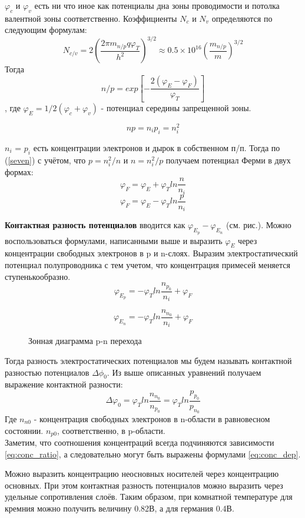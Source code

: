 $\varphi_c$ и $\varphi_v$ есть ни что иное как потенциалы дна зоны проводимости и потолка валентной зоны соответственно. Коэффициенты $N_c$ и $N_v$ определяются по следующим формулам:
$$
N_{c/v} = 2\left(\frac{2\pi m_{n/p}q\varphi_T}{h^2}\right)^{3/2} \approx 0.5\times10^{16}\left(\frac{m_{n/p}}{m}\right)^{3/2}
$$
Тогда
\begin{equation}
n/p = exp\left[-\frac{2(\varphi_E - \varphi_F)}{\varphi_T}\right]
\label{seven}
\end{equation},
где $\varphi_E = 1/2(\varphi_c + \varphi_v)$ - потенциал середины запрещенной зоны.

$$
np = n_ip_i=n_i^2
$$

$n_i$ = $p_i$ есть концентрации электронов и дырок в собственном п/п. Тогда по (\ref{seven}) с учётом, что $p=n_i^2/n$ и $n = n_i^2/p$ получаем потенциал Ферми в двух формах:
$$
\varphi_F = \varphi_E + \varphi_Tln\frac{n}{n_i}
$$
$$
\varphi_F = \varphi_E - \varphi_Tln\frac{p}{n_i}
$$

\textbf{Контактная разность потенциалов} вводится как $\varphi_{E_p} - \varphi_{E_n}$ (см. рис.). Можно воспользоваться формулами, написанными выше и выразить $\varphi_E$ через концентрации свободных электронов в p и n-слоях.
Выразим электростатический потенциал полупроводника с тем учетом, что концентрация примесей меняется ступенькообразно.\\
$$
\varphi_{E_p} = -\varphi_Tln\frac{n_{p_0}}{n_i} + \varphi_F
$$

$$
\varphi_{E_n} = -\varphi_Tln\frac{n_{n_0}}{n_i} + \varphi_F
$$ 

\begin{center}
	\begin{figure}[h!]
		\caption{Зонная диаграмма p-n перехода}	
		\label{2D}
	\end{figure}
\end{center}


Тогда разность электростатических потенциалов мы будем называть контактной разностью потенциалов $ \Delta \phi_0$. Из выше описанных уравнений получаем выражение контактной разности:
\begin{equation}
\Delta\varphi_0 = \varphi_Tln\frac{n_{n_0}}{n_{p_0}} = \varphi_Tln\frac{p_{p_0}}{p_{n_0}}
\end{equation}
Где $n_{n0}$ - концентрация свободных электронов в n-области в равновесном состоянии. $n_{p0}$, соответственно, в p-области.\\
Заметим, что соотношения концентраций всегда подчиняются зависимости \ref{eq:conc_ratio}, а следовательно могут быть выражены формулами \ref{eq:conc_dep}.


Можно выразить концентрацию неосновных носителей через концентрацию основных. При этом контактная разность потенциалов можно выразить через удельные сопротивления слоёв. Таким образом, при комнатной температуре для кремния можно получить величину 0.82В, а для германия 0.4В.
\pagebreak
